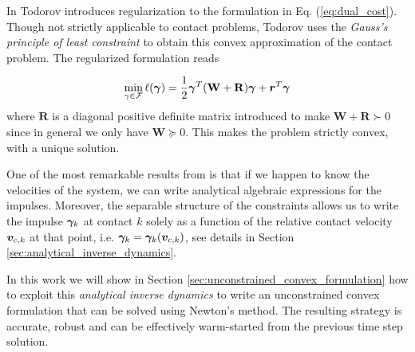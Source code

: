 In \cite{bib:todorov2011, bib:todorov2014} Todorov introduces regularization to
the formulation in Eq. (\ref{eq:dual_cost}). Though not strictly applicable to
contact problems, Todorov uses the \textit{Gauss's principle of least
constraint} to obtain this convex approximation of the contact problem. The
regularized formulation reads

\begin{eqnarray}
	\min_{\gamma\in \mathcal{F}} \ell(\bgamma) =
	\frac{1}{2}\bgamma^T(\mathbf{W}+\mathbf{R})\bgamma + {\bm r}^T
	\bgamma
	\label{eq:dual_regularized}
\end{eqnarray}
where $\mathbf{R}$ is a diagonal positive definite matrix introduced to
make $\mathbf{W}+\mathbf{R}\succ 0$ since in general we only have $\mathbf{W}
\succeq 0$. This makes the problem strictly convex, with a unique solution. 

One of the most remarkable results from \cite{bib:todorov2014} is that if we
 happen to know the velocities of the system, we can write analytical algebraic
 expressions for the impulses. Moreover, the separable structure of the
 constraints allows us to write the impulse ${\bm\gamma}_k$ at contact $k$ solely as
 a function of the relative contact velocity ${\bm{v}}_{c,k}$ at that point, i.e.
 ${\bm\gamma}_k = {\bm\gamma}_k({\bm{v}}_{c,k})$, see details in Section
 \ref{sec:analytical_inverse_dynamics}.

In this work we will show in Section \ref{sec:unconstrained_convex_formulation}
how to exploit this \textit{analytical inverse dynamics} to write an
unconstrained convex formulation that can be solved using Newton's method. The
resulting strategy is accurate, robust and can be effectively warm-started from
the previous time step solution.
